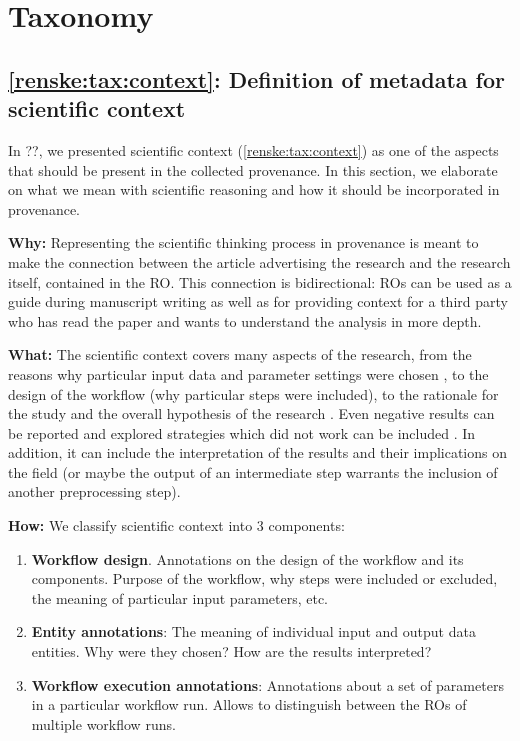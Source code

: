 \section{Taxonomy}

\subsection{\ref{renske:tax:context}: Definition of metadata for scientific context}
\label{sec:renske:reasoning_reqs}

In ??, we presented scientific context (\ref{renske:tax:context}) as one of the aspects that should be present in the collected provenance. In this section, we elaborate on what we mean with scientific reasoning and how it should be incorporated in provenance.

\textbf{Why:} Representing the scientific thinking process in provenance is meant to make the connection between the article advertising the research and the research itself, contained in the RO. This connection is bidirectional: ROs can be used as a guide during manuscript writing as well as for providing context for a third party who has read the paper and wants to understand the analysis in more depth.

\textbf{What:} The scientific context covers many aspects of the research, from the reasons why particular input data and parameter settings were chosen \cite{committeeonreproducibilityandreplicabilityinscienceReproducibilityReplicabilityScience2019}, to the design of the workflow (why particular steps were included), to the rationale for the study and the overall hypothesis of the research \cite{belhajjameResearchObjectSuite2014}\cite{gryk_workflows_2017}. Even negative results can be reported and explored strategies which did not work can be included \cite{stodden_2016}. In addition, it can include the interpretation of the results and their implications on the field (or maybe the output of an intermediate step warrants the inclusion of another preprocessing step).

\textbf{How:} We classify scientific context into 3 components:
\begin{enumerate}[label=\textbf{SC\arabic*}]
    \item \textbf{Workflow design}. Annotations on the design of the workflow and its components. Purpose of the workflow, why steps were included or excluded, the meaning of particular input parameters, etc. \label{renske:req:sr_wf}
    \item \textbf{Entity annotations}: The meaning of individual input and output data entities. Why were they chosen? How are the results interpreted? \label{renske:req:sr_data}
    \item \textbf{Workflow execution annotations}: Annotations about a set of parameters in a particular workflow run. Allows to distinguish between the ROs of multiple workflow runs. \label{renske:req:sr_ex}
\end{enumerate}
